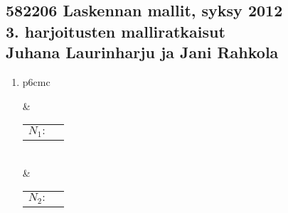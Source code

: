\documentclass[a4paper,11pt,draft]{article}
\begin{document}
\subsection*{582206 Laskennan mallit, syksy 2012 \\
  \textmd{3. harjoitusten malliratkaisut \\
    Juhana Laurinharju ja Jani Rahkola}}

\begin{enumerate}
\item
\begin{tabular}[t]{p{6cm}c}

&

\begin{tabular}{cm{4cm}}
$N_1:$ &
\begin{tikzpicture}[->,>=stealth',shorten >=1pt,auto,node distance=2cm,semithick]

 \node[state,initial,accepting] (q0)               {$q_0$};
 \node[state]                   (q1) [right of=q0] {$q_1$};

 \path (q0) edge [loop above]  node      {$a$}   ()
            edge               node     {$a$}  (q1)
       (q1) edge  [loop right]       node       {$b$}  ();
\end{tikzpicture} 
\end{tabular}

\\[2cm]

 & 
\begin{tabular}{cm{4cm}}
$N_2:$ &
\begin{tikzpicture}[->,>=stealth',shorten >=1pt,auto,node distance=2cm,semithick]

 \node[state,initial,accepting]	(q0)               {$q_0$};
 \node[state]   				(q1) [right of=q0] {$q_1$};
 \node[state,accepting]         (q2) [right of=q1] {$q_2$};
 \node[state,accepting]         (q3) [below of=q1] {$q_3$};
 

\end{tikzpicture}
\end{tabular}
\end{tabular}
\end{enumerate}
\end{document}
